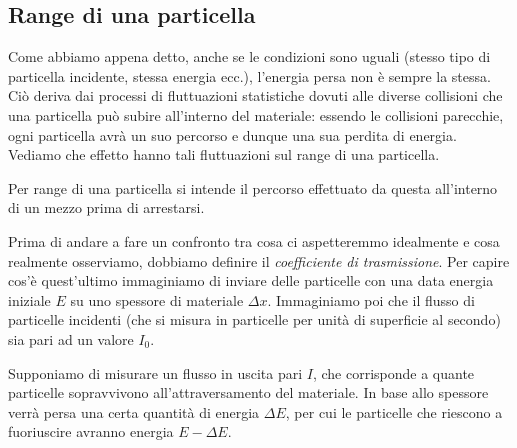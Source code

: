 \subsection{Range di una particella}

Come abbiamo appena detto, anche se le condizioni sono uguali (stesso tipo di particella incidente, stessa energia ecc.), l'energia persa non è sempre la stessa. Ciò deriva dai processi di fluttuazioni statistiche dovuti alle diverse collisioni che una particella può subire all'interno del materiale: essendo le collisioni parecchie, ogni particella avrà un suo percorso e dunque una sua perdita di energia. Vediamo che effetto hanno tali fluttuazioni sul range di una particella.

Per range di una particella si intende il percorso effettuato da questa all'interno di un mezzo prima di arrestarsi.

Prima di andare a fare un confronto tra cosa ci aspetteremmo idealmente e cosa realmente osserviamo, dobbiamo definire il \textit{coefficiente di trasmissione}. Per capire cos'è quest'ultimo immaginiamo di inviare delle particelle con una data energia iniziale $E$ su uno spessore di materiale $\Delta x$. Immaginiamo poi che il flusso di particelle incidenti (che si misura in particelle per unità di superficie al secondo) sia pari ad un valore $I_0$.

\begin{minipage}{0.295\textwidth}
    \begin{figure}[H]
        \centering
    \end{figure}
\end{minipage}
\begin{minipage}{0.7\textwidth}
    \vspace{0.2cm}Supponiamo di misurare un flusso in uscita pari $I$, che corrisponde a quante particelle sopravvivono all'attraversamento del materiale. In base allo spessore verrà persa una certa quantità di energia $\Delta E$, per cui le particelle che riescono a fuoriuscire avranno energia $E - \Delta E$.
\end{minipage}

